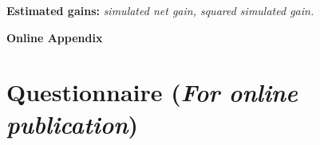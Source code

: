 \documentclass[12pt]{article} %
\begin{document}
\begin{appendices}
\noindent
\textbf{Estimated gains:} \textit{simulated net gain, squared simulated gain.}

\clearpage

\begin{center}
    {\huge \textbf{Online Appendix}}
\end{center}

\section{Questionnaire (\emph{For online publication})} \label{sec:questionnaire} 




\end{appendices}
\end{document}
